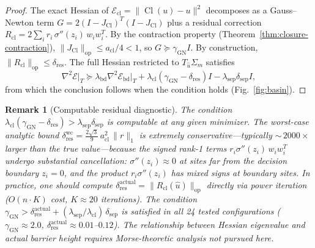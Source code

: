 \documentclass[lettersize,journal]{IEEEtran}
\newtheorem{remark}{Remark}
\DeclareMathOperator{\Cl}{Cl}
\begin{document}
\begin{proof}
The exact Hessian of $\mathcal{E}_{\mathrm{cl}} = \|\Cl(u) - u\|^2$ decomposes as a Gauss--Newton term $G = 2(I - J_{\Cl})^T(I - J_{\Cl})$ plus a residual correction $R_{\mathrm{cl}} = 2\sum_i r_i\,\sigma''(z_i)\,w_i w_i^T$. By the contraction property (Theorem~\ref{thm:closure-contraction}), $\|J_{\Cl}\|_{\mathrm{op}} \leq a_{\mathrm{cl}}/4 < 1$, so $G \succeq \gamma_{\mathrm{GN}} I$. By construction, $\|R_{\mathrm{cl}}\|_{\mathrm{op}} \leq \delta_{\mathrm{res}}$. The full Hessian restricted to $T_{\hat{u}}\Sigma_m$ satisfies
$$\nabla^2\mathcal{E}\big|_T \succeq \lambda_{\mathrm{bd}}\nabla^2\mathcal{E}_{\mathrm{bd}}\big|_T + \lambda_{\mathrm{cl}}(\gamma_{\mathrm{GN}} - \delta_{\mathrm{res}})I - \lambda_{\mathrm{sep}}\delta_{\mathrm{sep}}I,$$
from which the conclusion follows when the condition holds (Fig.~\ref{fig:basin}).
\end{proof}

\begin{remark}[Computable residual diagnostic]
The condition $\lambda_{\mathrm{cl}}(\gamma_{\mathrm{GN}} - \delta_{\mathrm{res}}) > \lambda_{\mathrm{sep}}\delta_{\mathrm{sep}}$ is \emph{computable} at any given minimizer. The worst-case analytic bound $\delta_{\mathrm{res}}^{\mathrm{wc}} = \frac{2\sqrt{3}}{9}\,a_{\mathrm{cl}}^2\,\|r\|_1$ is extremely conservative---typically ${\sim}\,2000\times$ larger than the true value---because the signed rank-1 terms $r_i\sigma''(z_i)\,w_i w_i^T$ undergo substantial cancellation: $\sigma''(z_i) \approx 0$ at sites far from the decision boundary $z_i = 0$, and the product $r_i\sigma''(z_i)$ has mixed signs at boundary sites. In practice, one should compute $\delta_{\mathrm{res}}^{\mathrm{actual}} = \|R_{\mathrm{cl}}(\hat{u})\|_{\mathrm{op}}$ directly via power iteration ($O(n \cdot K)$ cost, $K \approx 20$ iterations). The condition $\gamma_{\mathrm{GN}} > \delta_{\mathrm{res}}^{\mathrm{actual}} + (\lambda_{\mathrm{sep}}/\lambda_{\mathrm{cl}})\,\delta_{\mathrm{sep}}$ is satisfied in all 24 tested configurations ($\gamma_{\mathrm{GN}} \approx 2.0$, $\delta_{\mathrm{res}}^{\mathrm{actual}} \approx 0.01$--$0.12$). The relationship between Hessian eigenvalue and actual barrier height requires Morse-theoretic analysis not pursued here.
\end{remark}
\end{document}
